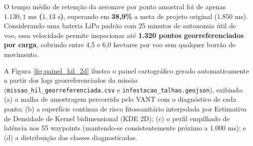 \documentclass[12pt]{article}
\begin{document}
\begin{table}[htbp]
\centering
\caption{Métricas Operacionais da Bancada de Co-Simulação HIL MAVLink (55 Waypoints)}
\label{tab:metricas_hil}
\end{table}

O tempo médio de retenção da aeronave por ponto amostral foi de apenas \textbf{$1.130,1\text{ ms}$ ($1,13\text{ s}$)}, superando em \textbf{38,9\%} a meta de projeto original ($1.850\text{ ms}$). Considerando uma bateria LiPo padrão com 25 minutos de autonomia útil de voo, essa velocidade permite inspecionar até \textbf{1.320 pontos georreferenciados por carga}, cobrindo entre 4,5 e 6,0 hectares por voo sem qualquer borrão de movimento.

A Figura \ref{fig:painel_hil_2d} ilustra o painel cartográfico gerado automaticamente a partir dos logs georreferenciados da missão (\texttt{missao\_hil\_georreferenciada.csv} e \texttt{infestacao\_talhao.geojson}), exibindo: (a) a malha de amostragem percorrida pelo VANT com o diagnóstico de cada ponto; (b) a superfície contínua de risco fitossanitário interpolada por Estimativa de Densidade de Kernel bidimensional (KDE 2D); (c) o perfil empilhado de latência nos 55 waypoints (mantendo-se consistentemente próximo a $1.000\text{ ms}$); e (d) a distribuição das classes diagnosticadas.
\end{document}
